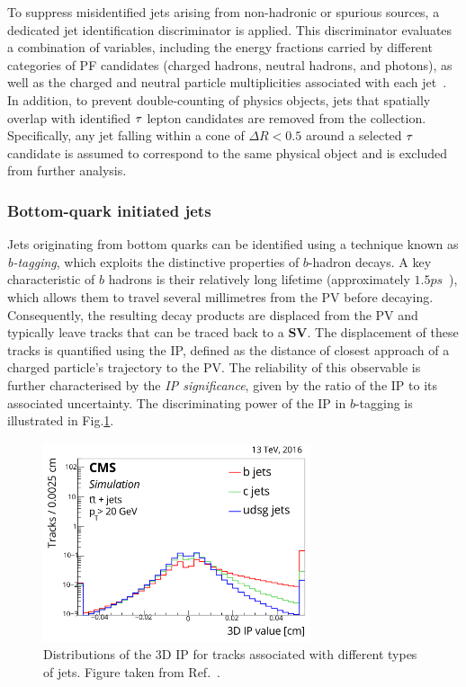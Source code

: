 To suppress misidentified jets arising from non-hadronic or spurious sources, a dedicated jet identification discriminator is applied. This discriminator evaluates a combination of variables, including the energy fractions carried by different categories of PF candidates (charged hadrons, neutral hadrons, and photons), as well as the charged and neutral particle multiplicities associated with each jet~\cite{Jet_Algorithm_Performance}. In addition, to prevent double-counting of physics objects, jets that spatially overlap with identified $\tau$ lepton candidates are removed from the collection. Specifically, any jet falling within a cone of $\Delta R < 0.5$ around a selected $\tau$ candidate is assumed to correspond to the same physical object and is excluded from further analysis.

\subsubsection{Bottom-quark initiated jets}

Jets originating from bottom quarks can be identified using a technique known as \textit{b-tagging}, which exploits the distinctive properties of $b$-hadron decays. A key characteristic of $b$ hadrons is their relatively long lifetime (approximately $1.5\unit{ps}$~\cite{ParticleMasses}), which allows them to travel several millimetres from the PV before decaying. Consequently, the resulting decay products are displaced from the PV and typically leave tracks that can be traced back to a \textbf{\ac{SV}}. The displacement of these tracks is quantified using the \ac{IP}, defined as the distance of closest approach of a charged particle’s trajectory to the PV. The reliability of this observable is further characterised by the \textit{IP significance}, given by the ratio of the IP to its associated uncertainty. The discriminating power of the IP in $b$-tagging is illustrated in Fig.\ref{Figure:Chapter4_IP_bjets}.

\begin{figure}[h]
\centering
\includegraphics[width=0.7\textwidth]{Figures/Chapter4/IP_bjets.pdf}
\caption[Distributions of the 3D impact parameter for tracks associated with different types of jets]{Distributions of the 3D IP for tracks associated with different types of jets. Figure taken from Ref.~\cite{HeavyFlavourJets_ID}.}
\label{Figure:Chapter4_IP_bjets}
\end{figure}

